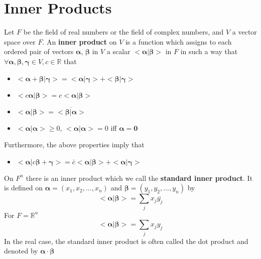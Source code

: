		\section{Inner Products}
			\begin{definition}
				Let $F$ be the field of real numbers or the field of complex numbers, and $V$ a vector space over $F$. An \textbf{inner product} on $V$ is a function which assigns to each ordered pair of vectors $\mathbf{\alpha}$, $\mathbf{\beta}$ in $V$ a scalar $<\mathbf{\alpha}|\mathbf{\beta}>$ in $F$ in such a way that $\forall \mathbf{\alpha}, \mathbf{\beta}, \mathbf{\gamma} \in V, c \in \mathbb{R}$ that
				\begin{itemize}
					\item $<\mathbf{\alpha}+\mathbf{\beta}|\mathbf{\gamma}> = <\mathbf{\alpha}|\mathbf{\gamma}> + <\mathbf{\beta}|\mathbf{\gamma}>$
					\item $<c\mathbf{\alpha}|\mathbf{\beta}> = c<\mathbf{\alpha}|\mathbf{\beta}>$
					\item $<\mathbf{\alpha}|\mathbf{\beta}> = \overline{<\mathbf{\beta}|\mathbf{\alpha}>}$
					\item $<\mathbf{\alpha}|\mathbf{\alpha}> \ge 0$, $<\mathbf{\alpha}|\mathbf{\alpha}> = 0$ iff $\mathbf{\alpha} = \mathbf{0}$
				\end{itemize}
				Furthermore, the above properties imply that
				\begin{itemize}
					\item $<\mathbf{\alpha}|c\mathbf{\beta}+\mathbf{\gamma}> = \bar{c}<\mathbf{\alpha}|\mathbf{\beta}> + <\mathbf{\alpha}|\mathbf{\gamma}>$
				\end{itemize}
			\end{definition}

			\begin{definition}
				On $F^n$ there is an inner product which we call the \textbf{standard inner product}. It is defined on $\mathbf{\alpha} = (x_1, x_2, ..., x_n)$ and $\mathbf{\beta} = (y_1, y_2, ..., y_n)$ by
				\begin{equation}
					<\mathbf{\alpha}|\mathbf{\beta}> = \sum_j x_j \bar{y_j}
				\end{equation}
				For $F = \mathbb{R}^n$
				\begin{equation}
					<\mathbf{\alpha}|\mathbf{\beta}> = \sum_j x_j y_j
				\end{equation}
				In the real case, the standard inner product is often called the dot product and denoted by $\mathbf{\alpha} \cdot \mathbf{\beta}$
			\end{definition}

